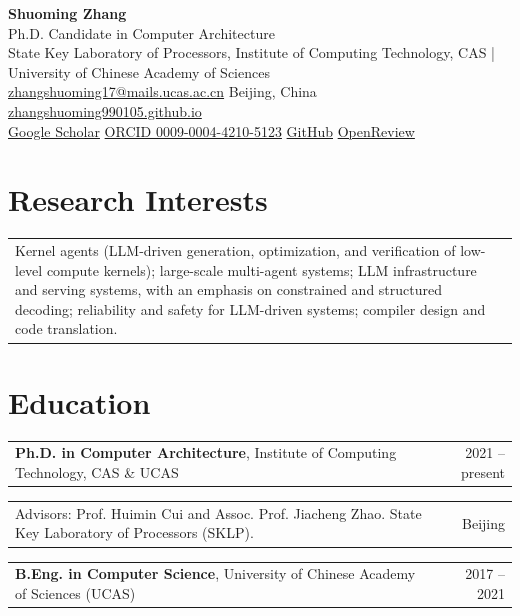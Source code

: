 \documentclass[11pt]{article}
\makeatletter
\newcommand{\datedline}[2]{%
  \noindent\begin{tabularx}{\textwidth}{@{}X@{}r@{}}
  #1 & {\small #2}
  \end{tabularx}\par}
\makeatother
\begin{document}
{\centering
  {\Huge\bfseries\color{accent} Shuoming Zhang}\\[0.6ex]
  {\normalsize Ph.D. Candidate in Computer Architecture}\\[0.4ex]
  {\small State Key Laboratory of Processors, Institute of Computing Technology, CAS \;|\; University of Chinese Academy of Sciences}\\[0.9ex]
  {\small
    \href{mailto:zhangshuoming17@mails.ucas.ac.cn}{zhangshuoming17@mails.ucas.ac.cn}
    \;\textbullet\;
    Beijing, China
    \;\textbullet\;
    \href{https://zhangshuoming990105.github.io}{zhangshuoming990105.github.io}
  }\\[0.3ex]
  {\small
    \href{https://scholar.google.com/citations?user=mVkTXAoAAAAJ&hl=en}{Google Scholar}
    \;\textbullet\;
    \href{https://orcid.org/0009-0004-4210-5123}{ORCID 0009-0004-4210-5123}
    \;\textbullet\;
    \href{https://github.com/zhangshuoming990105}{GitHub}
    \;\textbullet\;
    \href{https://openreview.net/profile?id=~Shuoming_Zhang1}{OpenReview}
  }\\
  \par
}
\vspace{0.5ex}

\section{Research Interests}
\datedline{Kernel agents (LLM-driven generation, optimization, and verification of low-level compute kernels); large-scale multi-agent systems; LLM infrastructure and serving systems, with an emphasis on constrained and structured decoding; reliability and safety for LLM-driven systems; compiler design and code translation.}{}

\section{Education}
\datedline{\textbf{Ph.D. in Computer Architecture}, Institute of Computing Technology, CAS \& UCAS}{2021 -- present}
\vspace{-0.4ex}
\datedline{\small Advisors: Prof. Huimin Cui and Assoc. Prof. Jiacheng Zhao. State Key Laboratory of Processors (SKLP).}{\small Beijing}
\vspace{0.6ex}
\datedline{\textbf{B.Eng. in Computer Science}, University of Chinese Academy of Sciences (UCAS)}{2017 -- 2021}
\end{document}
